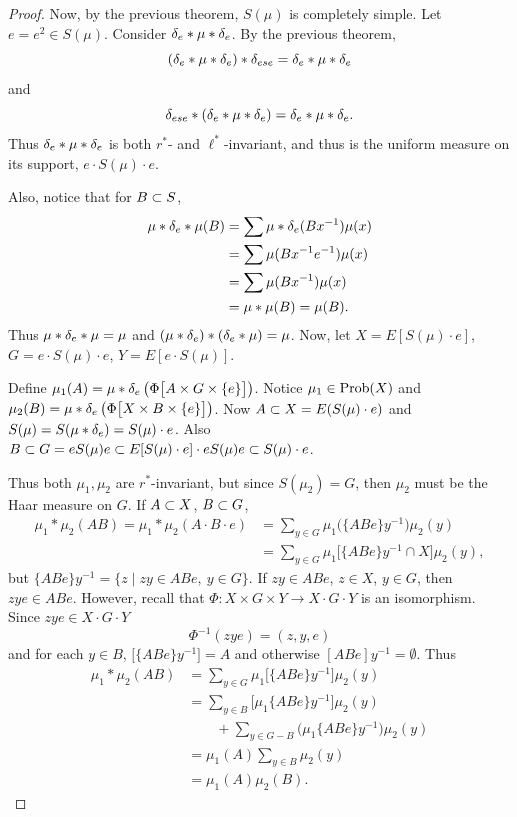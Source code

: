 \begin{proof} Now, by the previous theorem, $S(\mu)$ is completely simple.  Let $e = e^2 \in S(\mu)$.  
Consider $\delta_e * \mu * \delta_e$.  
By the previous theorem,
\[
     (\delta_e * \mu * \delta_e) * \delta_{ese} = \delta_e * \mu * \delta_e
\]
and
\[
     \delta_{ese} * (\delta_e * \mu * \delta_e) = \delta_e * \mu * \delta_e.
\]
Thus $\delta_e * \mu * \delta_e$ is both $r^*$- and $\ell^*$-invariant, and
thus is the uniform measure on its support, $e \cdot S(\mu) \cdot e$.

Also, notice that for $B \subset S$,
\[
\begin{aligned}
       \mu * \delta_e * \mu(B) &= \sum \mu * \delta_e (Bx^{-1}) \mu(x) \\
       &= \sum \mu(Bx^{-1}e^{-1}) \mu(x)                       \\
       &= \sum \mu(Bx^{-1}) \mu(x)                             \\
       &= \mu * \mu(B) = \mu(B).
\end{aligned}
\]
Thus $\mu * \delta_e * \mu = \mu$ and $(\mu * \delta_e) * (\delta_e * \mu) =
\mu$.  
Now, let $X = E[S(\mu) \cdot e]$, $G = e \cdot S(\mu) \cdot e$,
$Y = E[e \cdot S(\mu)]$.

Define $\mu_1(A) = \mu * \delta_e \left( \Phi \big[ A \times G \times \{ e \} \big] \right)$.  
Notice $\mu_1 \in \hbox{Prob}(X)$ and $\mu_2(B) = \mu * \delta_e \left( \Phi \big[ X \times B \times \{ e \} \big] \right)$.  
Now $A \subset X = E(S(\mu) \cdot e)$ and $S(\mu) = S(\mu * \delta_e) = S(\mu) \cdot e$.
Also $B \subset G = eS(\mu)e \subset E [S(\mu) \cdot e] \cdot eS(\mu) e \subset
S(\mu) \cdot e$.

Thus both $\mu_1,\mu_2$ are $r^*$-invariant, but since $S(\mu_2) = G$, then $\mu_2$ must be the Haar measure on $G$.  
If $A \subset X$, $B \subset G$,
\[
\begin{aligned}
       \mu_1 * \mu_2(AB) = \mu_1 * \mu_2(A \cdot B \cdot e)
               &= \sum_{y\in G} \mu_1
                    \big( \{ ABe \} y^{-1} \big) \mu_2(y)      \\
       &= \sum_{y\in G} \mu_1 \big[ \{ ABe \} y^{-1} \cap X
                    \big] \mu_2(y),
\end{aligned}
\]
but $\{ ABe \} y^{-1} = \{ z \mid zy \in ABe, \ y \in G \}$.  
If $zy \in ABe$, $z \in X$, $y \in G$, then $zye \in ABe$.  However, recall that $\Phi: X \times G \times Y \to X \cdot G \cdot Y$ is an isomorphism.
Since $zye \in X \cdot G \cdot Y$
\[
     \Phi^{-1} (zye) = (z,y,e)
\]
and for each $y \in B$, $\big[ \{ ABe \} y^{-1} \big] = A$ and
otherwise $[ABe] y^{-1} = \emptyset$.  
Thus
\[
\begin{aligned}
       \mu_1 * \mu_2(AB) &= \sum_{y \in G} \mu_1
               \big[ \{ ABe \} y^{-1} \big] \mu_2(y)           \\
       &= \sum_{y \in B} \big[ \mu_1\{ ABe \} y^{-1} \big] \mu_2(y) \\
       &\qquad + \sum_{y \in G-B}
               \big( \mu_1\{ ABe \} y^{-1} \big) \mu_2(y)           \\
       &= \mu_1(A) \sum_{y \in B} \mu_2(y)                     \\
       &= \mu_1(A) \mu_2(B).
\end{aligned}
\]


\end{proof}
